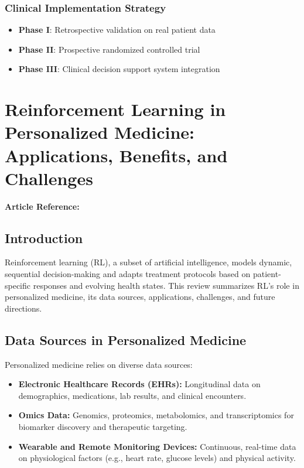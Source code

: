 \subsubsection{Clinical Implementation Strategy}
\begin{itemize}
    \item \textbf{Phase I}: Retrospective validation on real patient data
    \item \textbf{Phase II}: Prospective randomized controlled trial
    \item \textbf{Phase III}: Clinical decision support system integration
\end{itemize}




\section{Reinforcement Learning in Personalized Medicine: Applications, Benefits, and Challenges}
\textbf{Article Reference:} \cite{banumathiReinforcementLearningPersonalized2025a}

\subsection*{Introduction}
Reinforcement learning (RL), a subset of artificial intelligence, models dynamic, sequential decision-making and adapts treatment protocols based on patient-specific responses and evolving health states. This review summarizes RL's role in personalized medicine, its data sources, applications, challenges, and future directions.

\subsection*{Data Sources in Personalized Medicine}
Personalized medicine relies on diverse data sources:
\begin{itemize}
    \item \textbf{Electronic Healthcare Records (EHRs):} Longitudinal data on demographics, medications, lab results, and clinical encounters.
    \item \textbf{Omics Data:} Genomics, proteomics, metabolomics, and transcriptomics for biomarker discovery and therapeutic targeting.
    \item \textbf{Wearable and Remote Monitoring Devices:} Continuous, real-time data on physiological factors (e.g., heart rate, glucose levels) and physical activity.
\end{itemize}

